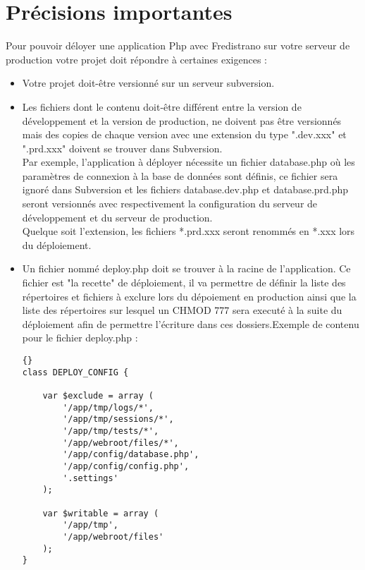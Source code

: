 \documentclass[12pt,a4paper]{report}
\begin{document}
\section{Précisions importantes}\label{precimportantes}
Pour pouvoir déloyer une application Php avec Fredistrano sur votre serveur de production votre projet doit répondre à certaines exigences :\\
\begin{itemize}
\item Votre projet doit-être versionné sur un serveur subversion.\\
\item Les fichiers dont le contenu doit-\^{e}tre différent entre la version de développement et la version de production, ne doivent pas être versionnés mais des copies de chaque version avec une extension du type ".dev.xxx" et ".prd.xxx" doivent se trouver dans Subversion.\\
Par exemple, l'application à déployer nécessite un fichier database.php où les paramètres de connexion à la base de données sont définis, ce fichier sera ignoré dans Subversion et les fichiers database.dev.php et database.prd.php seront versionnés avec respectivement la configuration du serveur de développement et du serveur de production.\\
Quelque soit l'extension, les fichiers *.prd.xxx seront renommés en *.xxx lors du déploiement.\\
\item Un fichier nommé deploy.php doit se trouver à la racine de l'application. Ce fichier est "la recette" de déploiement, il va permettre de définir la liste des répertoires et fichiers à exclure lors du dépoiement en production ainsi que la liste des répertoires sur lesquel un CHMOD 777 sera executé à la suite du déploiement afin de permettre l'écriture dans ces dossiers.\newpage Exemple de contenu pour le fichier deploy.php :\\

\lstset{language=Php}
\lstset{commentstyle=\textit}
\begin{lstlisting}[frame=tb]{}
class DEPLOY_CONFIG {

	var $exclude = array (
		'/app/tmp/logs/*',
		'/app/tmp/sessions/*',
		'/app/tmp/tests/*',
		'/app/webroot/files/*',
		'/app/config/database.php',
		'/app/config/config.php',
		'.settings'
	);

	var $writable = array (
		'/app/tmp',
		'/app/webroot/files'
	);
}
\end{lstlisting}

\end{itemize}
\newpage
\end{document}
